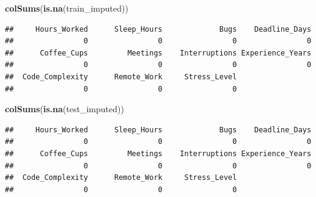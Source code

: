 \documentclass[
]{article}
\newenvironment{Shaded}{\begin{snugshade}}{\end{snugshade}}
\newcommand{\FunctionTok}[1]{\textcolor[rgb]{0.13,0.29,0.53}{\textbf{#1}}}
\newcommand{\NormalTok}[1]{#1}
\newcommand{\OtherTok}[1]{\textcolor[rgb]{0.56,0.35,0.01}{#1}}
\newcommand{\SpecialCharTok}[1]{\textcolor[rgb]{0.81,0.36,0.00}{\textbf{#1}}}
\begin{document}
\begin{Shaded}
\end{Shaded}

\begin{Shaded}
\begin{Highlighting}[]
\FunctionTok{colSums}\NormalTok{(}\FunctionTok{is.na}\NormalTok{(train\_imputed))}
\end{Highlighting}
\end{Shaded}

\begin{verbatim}
##     Hours_Worked      Sleep_Hours             Bugs    Deadline_Days 
##                0                0                0                0 
##      Coffee_Cups         Meetings    Interruptions Experience_Years 
##                0                0                0                0 
##  Code_Complexity      Remote_Work     Stress_Level 
##                0                0                0
\end{verbatim}

\begin{Shaded}
\begin{Highlighting}[]
\FunctionTok{colSums}\NormalTok{(}\FunctionTok{is.na}\NormalTok{(test\_imputed))}
\end{Highlighting}
\end{Shaded}

\begin{verbatim}
##     Hours_Worked      Sleep_Hours             Bugs    Deadline_Days 
##                0                0                0                0 
##      Coffee_Cups         Meetings    Interruptions Experience_Years 
##                0                0                0                0 
##  Code_Complexity      Remote_Work     Stress_Level 
##                0                0                0
\end{verbatim}
\end{document}
